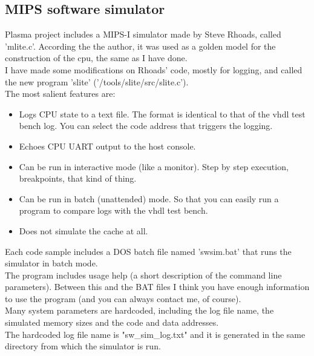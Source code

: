 \documentclass[11pt]{article}
\begin{document}
\subsection{MIPS software simulator}
\label{sw_simulator}

    Plasma project includes a MIPS-I simulator made by Steve Rhoads, called
    'mlite.c'. According the the author, it was used as a golden model for the
    construction of the cpu, the same as I have done.\\
    I have made some modifications on Rhoads' code, mostly for logging, and
    called the new program 'slite' ('/tools/slite/src/slite.c').\\
    
    The most salient features are:
    
    \begin{itemize}
    \item Logs CPU state to a text file.
        The format is identical to that of the vhdl test bench log.
        You can select the code address that triggers the logging.
    \item Echoes CPU UART output to the host console. 
    \item Can be run in interactive mode (like a monitor).
        Step by step execution, breakpoints, that kind of thing.
    \item Can be run in batch (unattended) mode.
        So that you can easily run a program to compare logs with the 
        vhdl test bench.
    \item Does not simulate the cache at all.
    \end{itemize}
    
    Each code sample includes a DOS batch file named 'swsim.bat' that runs the
    simulator in batch mode.\\ 
    
    The program includes usage help (a short description of the command line 
    parameters). Between this and the BAT files I think you have enough 
    information to use the program (and you can always contact me, of course).\\
    
    Many system parameters are hardcoded, including the log file name, the
    simulated memory sizes and the code and data addresses.\\

    The hardcoded log file name is "sw\_sim\_log.txt" and it is generated in the 
    same directory from which the simulator is run.\\
\end{document}
